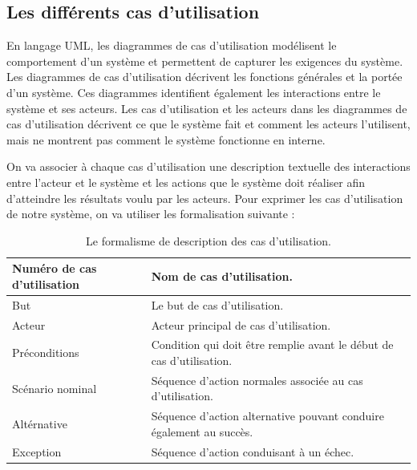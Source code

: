 \subsection{Les différents cas d'utilisation }
\par En langage UML, les diagrammes de cas d'utilisation modélisent le
comportement d'un système et permettent de capturer les exigences du système.
Les diagrammes de cas d'utilisation décrivent les fonctions générales et la
portée d'un système. Ces diagrammes identifient également les interactions
entre le système et ses acteurs. Les cas d'utilisation et les acteurs dans les
diagrammes de cas d'utilisation décrivent ce que le système fait et comment les
acteurs l'utilisent, mais ne montrent pas comment le système fonctionne en
interne.\cite{ref4}
\par On va associer à chaque cas d’utilisation une description  textuelle des
interactions entre l’acteur et le système et les actions que le système doit
réaliser afin d’atteindre les résultats voulu par les acteurs. Pour exprimer
les cas d’utilisation de notre système, on va utiliser les formalisation
suivante :


\begin{table}[H]
\begin{tabular}{ | p{5cm} | p{10cm} |}
\hline
Numéro de cas d’utilisation & Nom de cas d’utilisation. \\ 
\hline  
But & Le but de cas d’utilisation.\\ 
\hline
Acteur & Acteur principal de cas d’utilisation. \\ \hline
Préconditions & Condition qui doit être remplie avant le début de cas
d’utilisation.  \\
\hline
Scénario nominal & Séquence d’action normales associée au cas
d’utilisation.\\
\hline
Altérnative & Séquence d’action alternative pouvant conduire également au
succès. \\
\hline
Exception & Séquence d’action conduisant à un échec. \\
\hline
\end{tabular}
\caption{Le formalisme de description des cas d'utilisation.}
\label{tab:my_label}
\end{table}



